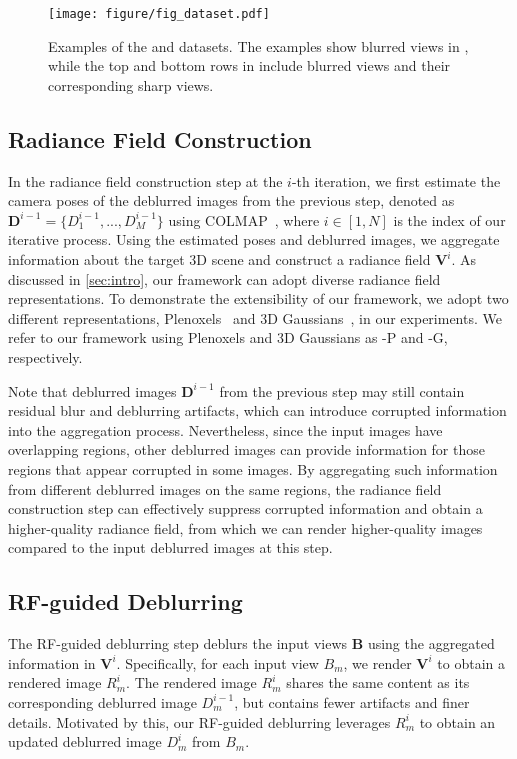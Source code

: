 \begin{figure*}[t]
    \centering
    \texttt{[image: figure/fig\_dataset.pdf]}
    \caption{Examples of the \SynthDataName{} and \RealDataName{} datasets. The examples show blurred views in \RealDataName{}, while the top and bottom rows in \SynthDataName{} include blurred views and their corresponding sharp views.}
    \label{fig:dataset}
\end{figure*}


\subsection{Radiance Field Construction}
In the radiance field construction step at the $i$-th iteration, we first estimate the camera poses of the deblurred images from the previous step, denoted as $\textbf{D}^{i-1} = \{D_1^{i-1}, ..., D_M^{i-1}\}$ using COLMAP~\cite{schoenberger2016sfm}, where $i \in [1, N]$ is the index of our iterative process.
Using the estimated poses and deblurred images, we aggregate information about the target 3D scene and construct a radiance field $\mathbf{V}^i$.
As discussed in \cref{sec:intro}, our framework can adopt diverse radiance field representations.
To demonstrate the extensibility of our framework, we adopt two different representations, Plenoxels~\cite{fridovich2022plenoxels} and 3D Gaussians~\cite{kerbl2023gaussiansplatting}, in our experiments.
We refer to our framework using Plenoxels and 3D Gaussians as \MethodName{}-P and \MethodName{}-G, respectively.

Note that deblurred images $\textbf{D}^{i-1}$ from the previous step may still contain residual blur and deblurring artifacts, which can introduce corrupted information into the aggregation process.
Nevertheless, since the input images have overlapping regions, other deblurred images can provide information for those regions that appear corrupted in some images.
By aggregating such information from different deblurred images on the same regions, the radiance field construction step can effectively suppress corrupted information and obtain a higher-quality radiance field, from which we can render higher-quality images compared to the input deblurred images at this step.


\subsection{RF-guided Deblurring}
The RF-guided deblurring step deblurs the input views $\textbf{B}$ using the aggregated information in $\textbf{V}^i$.
Specifically, for each input view $B_m$, we render $\textbf{V}^i$ to obtain a rendered image $R_m^i$.
The rendered image $R_m^i$ shares the same content as its corresponding deblurred image $D_m^{i-1}$, but contains fewer artifacts and finer details.
Motivated by this, our RF-guided deblurring leverages $R_m^i$ to obtain an updated deblurred image $D_m^i$ from $B_m$.

